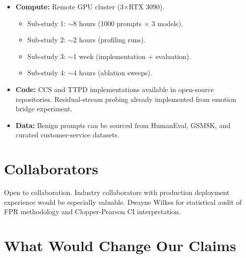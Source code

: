 \documentclass[11pt,letterpaper]{article}
\begin{document}
\begin{itemize}
  \item \textbf{Compute:} Remote GPU cluster (3$\times$RTX 3090).
    \begin{itemize}
      \item Sub-study 1: $\sim$8 hours (1000 prompts $\times$ 3 models).
      \item Sub-study 2: $\sim$2 hours (profiling runs).
      \item Sub-study 3: $\sim$1 week (implementation + evaluation).
      \item Sub-study 4: $\sim$4 hours (ablation sweeps).
    \end{itemize}
  \item \textbf{Code:} CCS and TTPD implementations available in
    open-source repositories. Residual-stream probing already implemented
    from emotion bridge experiment.
  \item \textbf{Data:} Benign prompts can be sourced from HumanEval,
    GSM8K, and curated customer-service datasets.
\end{itemize}

\section{Collaborators}

Open to collaboration. Industry collaborators with production deployment
experience would be especially valuable. Dwayne Wilkes for statistical
audit of FPR methodology and Clopper-Pearson CI interpretation.

\section{What Would Change Our Claims}
\end{document}
